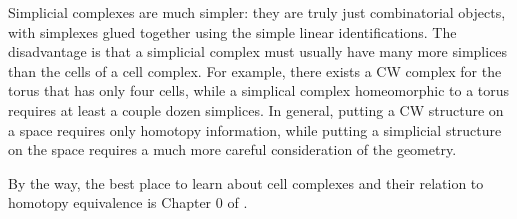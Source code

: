Simplicial complexes are much simpler: they are truly just combinatorial objects, with simplexes glued together using the simple linear identifications.  The disadvantage is that a simplicial complex must usually have many more simplices than the cells of a cell complex.  For example, there exists a CW complex for the torus that has only four cells, while a simplical complex homeomorphic to a torus requires at least a couple dozen simplices.  In general, putting a CW structure on a space requires only homotopy information, while putting a simplicial structure on the space requires a much more careful consideration of the geometry.\par

By the way, the best place to learn about cell complexes and their relation to homotopy equivalence is Chapter 0 of \cite{hatcher}.